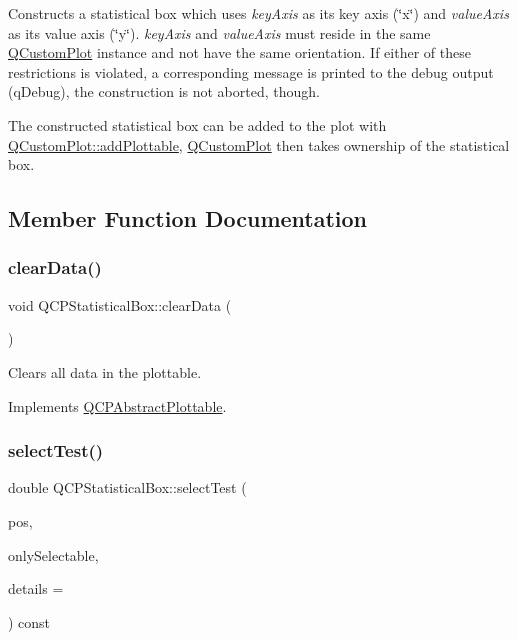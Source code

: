 Constructs a statistical box which uses {\itshape key\+Axis} as its key axis (\char`\"{}x\char`\"{}) and {\itshape value\+Axis} as its value axis (\char`\"{}y\char`\"{}). {\itshape key\+Axis} and {\itshape value\+Axis} must reside in the same \hyperlink{class_q_custom_plot}{Q\+Custom\+Plot} instance and not have the same orientation. If either of these restrictions is violated, a corresponding message is printed to the debug output (q\+Debug), the construction is not aborted, though.

The constructed statistical box can be added to the plot with \hyperlink{class_q_custom_plot_ab7ad9174f701f9c6f64e378df77927a6}{Q\+Custom\+Plot\+::add\+Plottable}, \hyperlink{class_q_custom_plot}{Q\+Custom\+Plot} then takes ownership of the statistical box. 

\subsection{Member Function Documentation}
\hypertarget{class_q_c_p_statistical_box_a19112994449df0c20287858436cc68e3}{}\label{class_q_c_p_statistical_box_a19112994449df0c20287858436cc68e3} 
\subsubsection{\texorpdfstring{clear\+Data()}{clearData()}}
{\footnotesize\ttfamily void Q\+C\+P\+Statistical\+Box\+::clear\+Data (\begin{DoxyParamCaption}{ }\end{DoxyParamCaption})\hspace{0.3cm}{\ttfamily [virtual]}}

Clears all data in the plottable. 

Implements \hyperlink{class_q_c_p_abstract_plottable_a86e5b8fd4b6ff4f4084e7ea4c573fc53}{Q\+C\+P\+Abstract\+Plottable}.

\hypertarget{class_q_c_p_statistical_box_a0153ac16326b94450afbca208e3f9961}{}\label{class_q_c_p_statistical_box_a0153ac16326b94450afbca208e3f9961} 
\subsubsection{\texorpdfstring{select\+Test()}{selectTest()}}
{\footnotesize\ttfamily double Q\+C\+P\+Statistical\+Box\+::select\+Test (\begin{DoxyParamCaption}\item[{const Q\+PointF \&}]{pos,  }\item[{bool}]{only\+Selectable,  }\item[{Q\+Variant $\ast$}]{details = {} }\end{DoxyParamCaption}) const\hspace{0.3cm}{\ttfamily [virtual]}}

